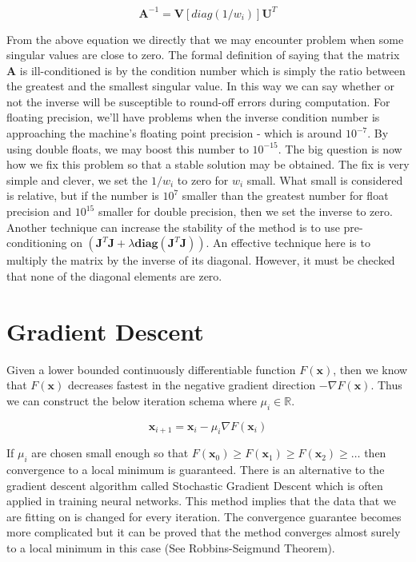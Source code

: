 \documentclass[a4paper,10pt]{article}
\theoremstyle{definition}
\begin{document}
\begin{equation}
	\pmb{A}^{-1} = \pmb{V}[diag(1 / w_i)] \pmb{U}^T
\end{equation}

From the above equation we directly that we may encounter problem when some singular values are close to zero. The formal definition of saying that the matrix $\pmb{A}$ is ill-conditioned is by the condition number which is simply the ratio between the greatest and the smallest singular value. In this way we can say whether or not the inverse will be susceptible to round-off errors during computation. For floating precision, we'll have problems when the inverse condition number is approaching the machine's floating point precision - which is around $10^{-7}$. By using double floats, we may boost this number to $10^{-15}$. The big question is now how we fix this problem so that a stable solution may be obtained. The fix is very simple and clever, we set the $1/w_i$ to zero for $w_i$ small. What small is considered is relative, but if the number is $10^7$ smaller than the greatest number for float precision and $10^{15}$ smaller for double precision, then we set the inverse to zero.\\

Another technique can increase the stability of the method is to use pre-conditioning on  $(\pmb{J}^T\pmb{J} + \lambda\pmb{diag}(\pmb{J}^T\pmb{J}))$. An effective technique here is to multiply the matrix by the inverse of its diagonal. However, it must be checked that none of the diagonal elements are zero.

\section{Gradient Descent}
Given a lower bounded continuously differentiable function $F(\pmb{x})$, then we know that $F(\pmb{x})$ decreases fastest in the negative gradient direction $-\nabla F(\pmb{x})$. Thus we can construct the below iteration schema where $\mu_i \in \mathbb{R}$.

\begin{equation}
	\pmb{x}_{i+1} = \pmb{x}_i - \mu_i \nabla F(\pmb{x}_i)
	\label{eq:descentUpdate}
\end{equation}

If $\mu_i$ are chosen small enough so that $F(\pmb{x}_0) \geq F(\pmb{x}_1) \geq F(\pmb{x}_2) \ge \hdots$ then convergence to a local minimum is guaranteed. There is an alternative to the gradient descent algorithm called Stochastic Gradient Descent which is often applied in training neural networks. This method implies that the data that we are fitting on is changed for every iteration. The convergence guarantee becomes more complicated but it can be proved that the method converges almost surely to a local minimum in this case (See Robbins-Seigmund Theorem).
\end{document}
